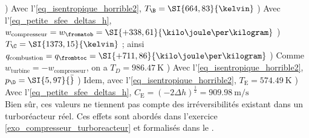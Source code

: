 \begin{description}
						) Avec l’\cref{eq_isentropique_horrible2}, $T_\B = \SI{664,83}{\kelvin}$
						) Avec l’\cref{eq_petite_sfee_deltas_h}, $w_\text{compresseur} = w_\fromatob = \SI{+338,61}{\kilo\joule\per\kilogram}$
						) $T_\C = \SI{1373,15}{\kelvin}$ ; ainsi $q_\text{combustion} = q_\frombtoc = \SI{+711,86}{\kilo\joule\per\kilogram}$
						) Comme $w_\text{turbine} = - w_\text{compresseur}$, on a $T_D = \SI{986,47}{\kelvin}$
						) Avec l’\cref{eq_isentropique_horrible2}, $p_\D = \SI{5,97}{\bar}$
						) Idem, avec l’\cref{eq_isentropique_horrible2}, $T_\text{E} = \SI{574,49}{\kelvin}$
						) Avec l’\cref{eq_petite_sfee_deltas_h}, $C_\text{E} = \left(-2\Delta h\right)^\frac{1}{2} = \SI{909,98}{\metre\per\second}$\\
						\tab Bien sûr, ces valeurs ne tiennent pas compte des irréversibilités existant dans un turboréacteur réel. Ces effets sont abordés dans l’exercice \ref{exo_compresseur_turboreacteur} et formalisés dans le \coursdix.
\end{description}
